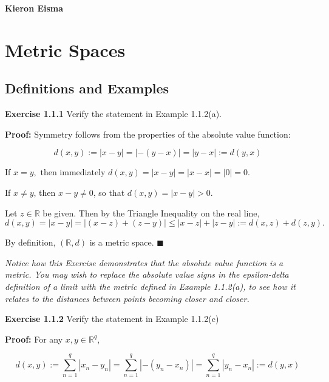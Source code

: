 \documentclass{article}
\begin{document}
\textbf{Kieron Eisma}

\newpage
\section{ Metric Spaces}

\subsection{ Definitions and Examples}

\begin{tcolorbox}
    \textbf{Exercise 1.1.1} Verify the statement in Example 1.1.2(a).
\end{tcolorbox}

\textbf{Proof:} Symmetry follows from the properties of the absolute value function:

\begin{equation*}
    d(x,y):=|x-y|=|-(y-x)|=|y-x|:=d(y,x)
\end{equation*}

If $x=y,$ then immediately $d(x,y)=|x-y|=|x-x|=|0|=0$.

If $x\ne y$, then $x-y\neq 0$, so that $d(x,y)=|x-y|>0$.

Let $z\in \mathbb{R}$ be given. Then by the Triangle Inequality on the real line,
\begin{equation*}
    d(x,y)=|x-y|=|(x-z)+(z-y)|\leq |x-z|+|z-y|:=d(x,z)+d(z,y).
\end{equation*}

By definition, $(\mathbb{R},d)$ is a metric space. $\blacksquare$

\begin{tcolorbox}[opacitybacktitle=0.25, colback=yellow!20!white,colframe=blue!70!green,title={Remark:}]
\textit{Notice how this Exercise demonstrates that the absolute value function is a metric. You may wish to replace the absolute value signs in the epsilon-delta definition of a limit with the metric defined in Example 1.1.2(a), to see how it relates to the distances between points becoming closer and closer.}
\end{tcolorbox}

\newpage
\begin{tcolorbox}
    \textbf{Exercise 1.1.2} Verify the statement in Example 1.1.2(c)
\end{tcolorbox}

\textbf{Proof:} For any $x,y\in \mathbb{R}^q$,
 
\begin{equation*}
    d(x,y):=\sum_{n=1}^q|x_n-y_n|=\sum_{n=1}^q|-(y_n-x_n)|=\sum_{n=1}^q|y_n-x_n|:=d(y,x)
\end{equation*}
\end{document}
